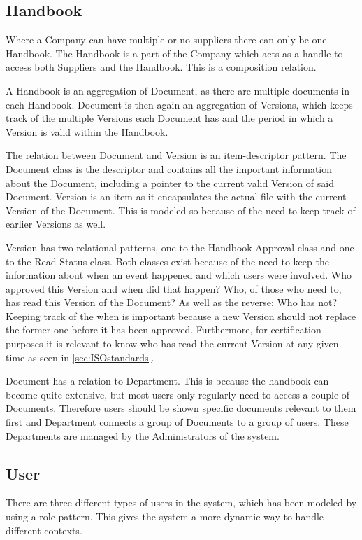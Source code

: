 \documentclass[../../master.tex]{subfiles}
\begin{document}
\subsection{Handbook}\label{sec:classdiagramhandbook}
Where a Company can have multiple or no suppliers there can only be one Handbook.
The Handbook is a part of the Company which acts as a handle to access both Suppliers and the Handbook. This is a composition relation.

A Handbook is an aggregation of Document, as there are multiple documents in each Handbook.
Document is then again an aggregation of Versions, which keeps track of the multiple Versions each Document has and the period in which a Version is valid within the Handbook.

The relation between Document and Version is an item-descriptor pattern.
The Document class is the descriptor and contains all the important information about the Document, including a pointer to the current valid Version of said Document.
Version is an item as it encapsulates the actual file with the current Version of the Document.
This is modeled so because of the need to keep track of earlier Versions as well.

Version has two relational patterns, one to the Handbook Approval class and one to the Read Status class.
Both classes exist because of the need to keep the information about when an event happened and which users were involved.
Who approved this Version and when did that happen?
Who, of those who need to, has read this Version of the Document?
As well as the reverse: Who has not?
Keeping track of the when is important because a new Version should not replace the former one before it has been approved.
Furthermore, for certification purposes it is relevant to know who has read the current Version at any given time as seen in \cref{sec:ISOstandards}.

Document has a relation to Department.
This is because the handbook can become quite extensive, but most users only regularly need to access a couple of Documents.
Therefore users should be shown specific documents relevant to them first and Department connects a group of Documents to a group of users.
These Departments are managed by the Administrators of the system.

\subsection{User}\label{sec:user}
There are three different types of users in the system, which has been modeled by using a role pattern. This gives the system a more dynamic way to handle different contexts.
\end{document}
